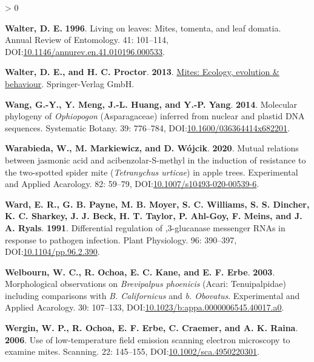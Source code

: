 \documentclass{ufdissertation}[overrideChapters] %
\newlength{\cslhangindent}
\newenvironment{CSLReferences}[2] %
 {%
  \setlength{\parindent}{0pt}
  \ifodd #1 \everypar{\setlength{\hangindent}{\cslhangindent}}\ignorespaces\fi
  \ifnum #2 > 0
  \setlength{\parskip}{#2\baselineskip}
  \fi
 }%
 {}
\begin{document}
{\begin{CSLReferences}{1}{1}
\leavevmode{}%
\textbf{Walter, D. E.} \textbf{1996}. Living on leaves: Mites, tomenta, and leaf domatia. Annual Review of Entomology. 41: 101--114, DOI:\href{https://doi.org/10.1146/annurev.en.41.010196.000533}{10.1146/annurev.en.41.010196.000533}.

\leavevmode{}%
\textbf{Walter, D. E., and H. C. Proctor}. \textbf{2013}. \href{https://www.ebook.de/de/product/20725813/david_evans_walter_heather_c_proctor_mites_ecology_evolution_behaviour.html}{Mites: Ecology, evolution \& behaviour}. Springer-Verlag GmbH.

\leavevmode{}%
\textbf{Wang, G.-Y., Y. Meng, J.-L. Huang, and Y.-P. Yang}. \textbf{2014}. Molecular phylogeny of {\emph{Ophiopogon}} {({Asparagaceae})} inferred from nuclear and plastid {DNA} sequences. Systematic Botany. 39: 776--784, DOI:\href{https://doi.org/10.1600/036364414x682201}{10.1600/036364414x682201}.

\leavevmode{}%
\textbf{Warabieda, W., M. Markiewicz, and D. Wójcik}. \textbf{2020}. Mutual relations between jasmonic acid and acibenzolar-{S}-methyl in the induction of resistance to the two-spotted spider mite ({\emph{Tetranychus urticae}}) in apple trees. Experimental and Applied Acarology. 82: 59--79, DOI:\href{https://doi.org/10.1007/s10493-020-00539-6}{10.1007/s10493-020-00539-6}.

\leavevmode{}%
\textbf{Ward, E. R., G. B. Payne, M. B. Moyer, S. C. Williams, S. S. Dincher, K. C. Sharkey, J. J. Beck, H. T. Taylor, P. Ahl-Goy, F. Meins, and J. A. Ryals}. \textbf{1991}. Differential regulation of ,3-glucanase messenger {RNAs} in response to pathogen infection. Plant Physiology. 96: 390--397, DOI:\href{https://doi.org/10.1104/pp.96.2.390}{10.1104/pp.96.2.390}.

\leavevmode{}%
\textbf{Welbourn, W. C., R. Ochoa, E. C. Kane, and E. F. Erbe}. \textbf{2003}. Morphological observations on {\emph{Brevipalpus phoenicis}} ({Acari}: {Tenuipalpidae}) including comparisons with {\emph{B. Californicus}} and {\emph{b. Obovatus}}. Experimental and Applied Acarology. 30: 107--133, DOI:\href{https://doi.org/10.1023/b:appa.0000006545.40017.a0}{10.1023/b:appa.0000006545.40017.a0}.

\leavevmode{}%
\textbf{Wergin, W. P., R. Ochoa, E. F. Erbe, C. Craemer, and A. K. Raina}. \textbf{2006}. Use of low-temperature field emission scanning electron microscopy to examine mites. Scanning. 22: 145--155, DOI:\href{https://doi.org/10.1002/sca.4950220301}{10.1002/sca.4950220301}.


\end{CSLReferences}}
\end{document}
